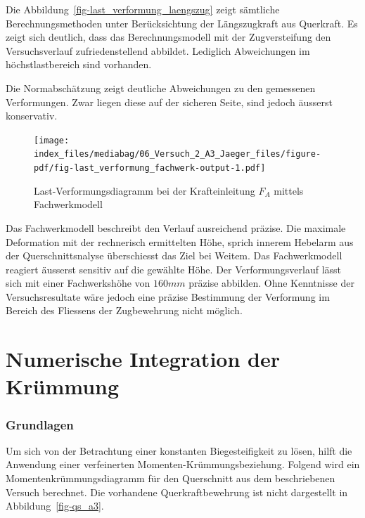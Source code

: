 \documentclass[
  letterpaper,
]{scrreprt}
\begin{document}
Die Abbildung~\ref{fig-last_verformung_laengszug} zeigt sämtliche
Berechnungsmethoden unter Berücksichtung der Längszugkraft aus
Querkraft. Es zeigt sich deutlich, dass das Berechnungsmodell mit der
Zugversteifung den Versuchsverlauf zufriedenstellend abbildet. Lediglich
Abweichungen im höchstlastbereich sind vorhanden.

Die Normabschätzung zeigt deutliche Abweichungen zu den gemessenen
Verformungen. Zwar liegen diese auf der sicheren Seite, sind jedoch
äusserst konservativ.

\begin{figure}[H]

{\centering \texttt{[image: index\_files/mediabag/06\_Versuch\_2\_A3\_Jaeger\_files/figure-pdf/fig-last\_verformung\_fachwerk-output-1.pdf]}

}

\caption{\label{fig-last_verformung_fachwerk}Last-Verformungsdiagramm
bei der Krafteinleitung \(F_A\) mittels Fachwerkmodell}

\end{figure}

Das Fachwerkmodell beschreibt den Verlauf ausreichend präzise. Die
maximale Deformation mit der rechnerisch ermittelten Höhe, sprich
innerem Hebelarm aus der Querschnittsnalyse überschiesst das Ziel bei
Weitem. Das Fachwerkmodell reagiert äusserst sensitiv auf die gewählte
Höhe. Der Verformungsverlauf lässt sich mit einer Fachwerkshöhe von
\(160mm\) präzise abbilden. Ohne Kenntnisse der Versuchsresultate wäre
jedoch eine präzise Bestimmung der Verformung im Bereich des Fliessens
der Zugbewehrung nicht möglich.


\hypertarget{numerische-integration-der-kruxfcmmung-2}{%
\chapter{Numerische Integration der
Krümmung}\label{numerische-integration-der-kruxfcmmung-2}}

\hypertarget{grundlagen-1}{%
\subsection{Grundlagen}\label{grundlagen-1}}

Um sich von der Betrachtung einer konstanten Biegesteifigkeit zu lösen,
hilft die Anwendung einer verfeinerten Momenten-Krümmungsbeziehung.
Folgend wird ein Momentenkrümmungsdiagramm für den Querschnitt aus dem
beschriebenen Versuch berechnet. Die vorhandene Querkraftbewehrung ist
nicht dargestellt in Abbildung~\ref{fig-qs_a3}.
\end{document}
